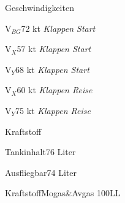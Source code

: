 \begin{task}
  \begin{checklist}{Geschwindigkeiten}
    \item{V$_{BG}$}{72 kt \textit{Klappen Start}}
    \item{V$_{X}$}{57 kt \textit{Klappen Start}}
    \item{V$_{Y}$}{68 kt \textit{Klappen Start}}
    \item{V$_{X}$}{60 kt \textit{Klappen Reise}}
    \item{V$_{Y}$}{75 kt \textit{Klappen Reise}}
  \end{checklist}
  \begin{checklist}{Kraftstoff}
    \item{Tankinhalt}{76 Liter}
    \item{Ausfliegbar}{74 Liter}
    \item{Kraftstoff}{Mogas\&Avgas 100LL}
  \end{checklist}
\end{task}

